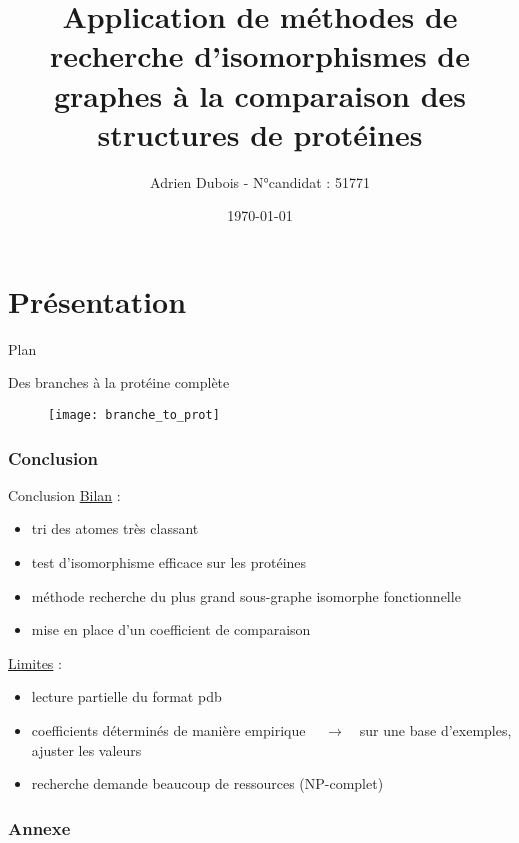 


\title{Application de méthodes de recherche d'isomorphismes de graphes à la comparaison des structures de protéines}
\author{Adrien Dubois - N°candidat : 51771}
\date{\today}


\part{Présentation}
\maketitle

\begin{frame}{Plan}
\tableofcontents
\end{frame}





\begin{frame}{Des branches à la protéine complète}
    \normalsize
    \begin{figure}[!htb]
        \centering
        \texttt{[image: branche\_to\_prot]}
    \end{figure}
\end{frame}







\section{Conclusion}
\begin{frame}{Conclusion}
    \underline{Bilan} :
    \begin{itemize}
        \item tri des atomes très classant
        \item test d'isomorphisme efficace sur les protéines
        \item méthode recherche du plus grand sous-graphe isomorphe fonctionnelle 
        \item mise en place d'un coefficient de comparaison
    \end{itemize}
    \underline{Limites} : 
    \begin{itemize}
        \item lecture partielle du format pdb
        \item coefficients déterminés de manière empirique
        \newline $\quad \rightarrow \quad$sur une base d'exemples, ajuster les valeurs
        \item recherche demande beaucoup de ressources (NP-complet)
    \end{itemize}
\end{frame}

\section{Annexe}







